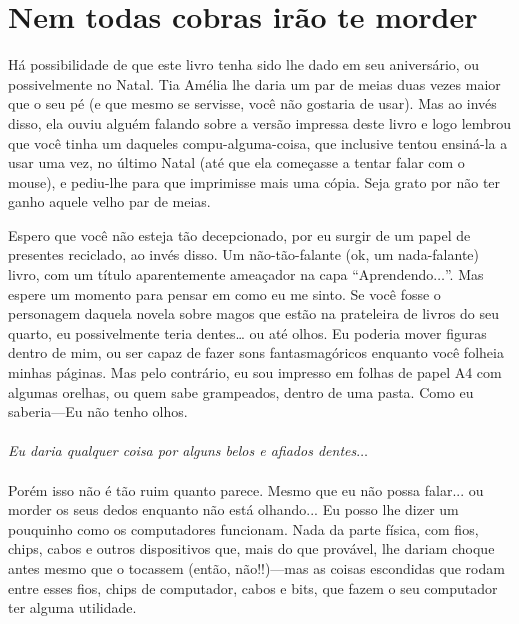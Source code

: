 

\chapter{Nem todas cobras irão te morder}\label{ch:notallsnakeswillsquishyou}

Há possibilidade de que este livro tenha sido lhe dado em seu aniversário, ou possivelmente no Natal. Tia Amélia lhe daria um par de meias duas vezes maior que o seu pé (e que mesmo se servisse, você não gostaria de usar). Mas ao invés disso, ela ouviu alguém falando sobre a versão impressa deste livro e logo lembrou que você tinha um daqueles compu-alguma-coisa, que inclusive tentou ensiná-la a usar uma vez, no último Natal (até que ela começasse a tentar falar com o mouse), e pediu-lhe para que imprimisse mais uma cópia. Seja grato por não ter ganho aquele velho par de meias.

Espero que você não esteja tão decepcionado, por eu surgir de um papel de presentes reciclado, ao invés disso. Um não-tão-falante (ok, um nada-falante) livro, com um título aparentemente ameaçador na capa ``Aprendendo$\ldots$''.
Mas espere um momento para pensar em como eu me sinto. Se você fosse o personagem daquela novela sobre magos que estão na prateleira de livros do seu quarto, eu possivelmente teria dentes… ou até olhos. Eu poderia mover figuras dentro de mim, ou ser capaz de fazer sons fantasmagóricos enquanto você folheia minhas páginas. Mas pelo contrário, eu sou impresso em folhas de papel A4 com algumas orelhas, ou quem sabe grampeados, dentro de uma pasta. Como eu saberia---Eu não tenho olhos.
\\
\\
\emph{Eu daria qualquer coisa por alguns belos e afiados dentes$\ldots$}
\\
\\
Porém isso não é tão ruim quanto parece. Mesmo que eu não possa falar... ou morder os seus dedos enquanto não está olhando... Eu posso lhe dizer um pouquinho como os computadores funcionam. Nada da parte física, com fios, chips, cabos e outros dispositivos que, mais do que provável, lhe dariam choque antes mesmo que o tocassem (então, não!!)---mas as coisas escondidas que rodam entre esses fios, chips de computador, cabos e bits, que fazem o seu computador ter alguma utilidade.

